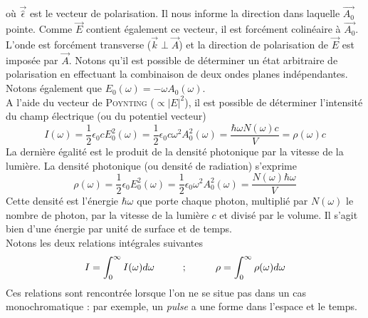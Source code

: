 où $\vec{\hat{\epsilon}}$ est le vecteur de polarisation. Il nous informe la direction dans laquelle
$\vec{A_0}$ pointe. Comme $\vec{E}$ contient également ce vecteur, il est forcément colinéaire à 
$\vec{A_0}$. L'onde est forcément transverse ($\vec{k}\perp\vec{A}$) et la direction de polarisation
de $\vec{E}$ est imposée par $\vec{A}$. Notons qu'il est possible de déterminer un état arbitraire
de polarisation en effectuant la combinaison de deux ondes planes indépendantes. Notons également
que $E_0(\omega) = - \omega A_0(\omega)$.\\

A l'aide du vecteur de \textsc{Poynting} ($\propto |E|^2$), il est possible de déterminer l'intensité
du champ électrique (ou du potentiel vecteur)
\begin{equation}
  I(\omega) 
= \frac{1}{2} \epsilon_0 c E_0^2 (\omega) 
=  \frac{1}{2} \epsilon_0 c \omega^2  A_0^2 (\omega) 
= \frac{\hbar \omega N(\omega) c}{V}
= \rho (\omega) c
\end{equation}
La dernière égalité est le produit de la densité photonique par la vitesse de la lumière. La densité
photonique (ou densité de radiation) s'exprime
\begin{equation}
\rho(\omega) 
= \frac{1}{2} \epsilon_0 E_0^2 (\omega)
= \frac{1}{2} \epsilon_0 \omega^2
A_0^2 (\omega) = \frac{N (\omega) \hbar \omega}{V}
\end{equation}
Cette densité est l'énergie $\hbar\omega$ que porte chaque photon, multiplié par $N(\omega)$ le nombre
de photon, par la vitesse de la lumière $c$ et divisé par le volume. Il s'agit bien d'une énergie par
unité de surface et de temps.\\

Notons les deux relations intégrales suivantes
\begin{equation}
I = \int_0^\infty I (\omega) d\omega \hspace*{1cm};
\hspace*{1cm}
\rho = \int_0^\infty \rho (\omega) d\omega 
\end{equation}
Ces relations sont rencontrée lorsque l'on ne se situe pas dans un cas monochromatique : par exemple,
un \textit{pulse} a une forme dans l'espace et le temps.

